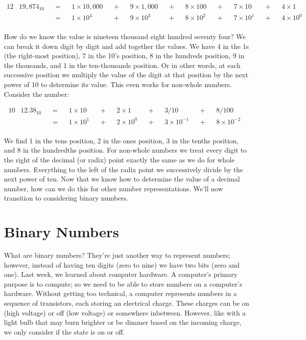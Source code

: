 \begin{alignat*}{12}
& 19,874_{10} &&=&& 1\times10,000 &&+&& 9\times1,000 &&+&& 8\times100  &&+&& 7\times10   &&+&& 4\times1    &\\
&             &&=&& 1\times10^4   &&+&& 9\times10^3  &&+&& 8\times10^2 &&+&& 7\times10^1 &&+&& 4\times10^0 &\\
\end{alignat*}

How do we know the value is nineteen thousand eight hundred seventy four? We can
break it down digit by digit and add together the values. We have 4 in the 1s (the
right-most position), 7 in the 10’s position, 8 in the hundreds position, 9 in the
thousands, and 1 in the ten-thousands position. Or in other words, at each
successive position we multiply the value of the digit at that position by the next
power of 10 to determine its value. This even works for non-whole numbers. Consider
the number:

\begin{alignat*}{10}
& 12.38_{10} &&=&& 1\times10   &&+&& 2\times1    &&+&& 3/10           &&+&& 8/100            &\\
&            &&=&& 1\times10^1 &&+&& 2\times10^0 &&+&& 3\times10^{-1} &&+&& 8 \times 10^{-2} &\\
\end{alignat*}

We find 1 in the tens position, 2 in the ones position, 3 in the tenths position,
and 8 in the hundredths position. For non-whole numbers we treat every digit to the
right of the decimal (or radix) point exactly the same as we do for whole numbers.
Everything to the left of the radix point we successively divide by the next power
of ten. Now that we know how to determine the value of a decimal number, how can we
do this for other number representations. We’ll now transition to considering binary
numbers.

\section{Binary Numbers}
What are binary numbers? They’re just another way to represent numbers; however,
instead of having ten digits (zero to nine) we have two bits (zero and one). Last
week, we learned about computer hardware. A computer’s primary purpose is to
compute; so we need to be able to store numbers on a computer’s hardware. Without
getting too technical, a computer represents numbers in a sequence of transistors,
each storing an electrical charge. These charges can be on (high voltage) or off
(low voltage) or somewhere inbetween. However, like with a light bulb that may burn
brighter or be dimmer based on the incoming charge, we only consider if the state
is on or off.

